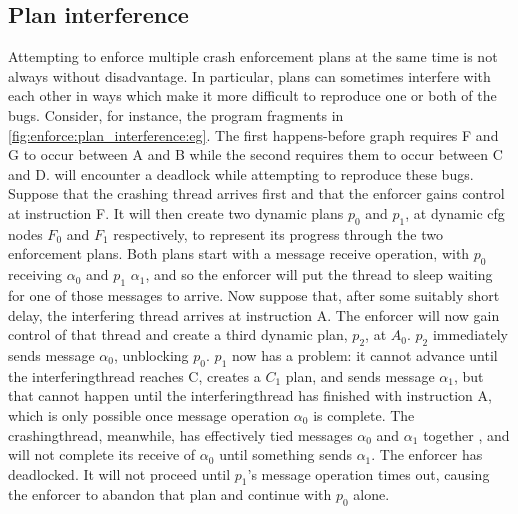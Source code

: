 \subsection{Plan interference}
\label{sect:enforce:plan_interference}

Attempting to enforce multiple crash enforcement plans at the same
time is not always without disadvantage.  In particular, plans can
sometimes interfere with each other in ways which make it more
difficult to reproduce one or both of the bugs.  Consider, for
instance, the program fragments in
\autoref{fig:enforce:plan_interference:eg}.  The first happens-before
graph requires F and G to occur between A and B while the second
requires them to occur between C and D.  {\Implementation} will
encounter a deadlock while attempting to reproduce these bugs.
Suppose that the crashing thread arrives first and that the enforcer
gains control at instruction F.  It will then create two dynamic plans
$p_0$ and $p_1$, at \gls{dynamic cfg} nodes $F_0$ and $F_1$
respectively, to represent its progress through the two enforcement
plans.  Both plans start with a message receive operation, with $p_0$
receiving $\alpha_0$ and $p_1$ $\alpha_1$, and so the enforcer will
put the thread to sleep waiting for one of those messages to arrive.
Now suppose that, after some suitably short delay, the interfering
thread arrives at instruction A.  The enforcer will now gain control
of that thread and create a third dynamic plan, $p_2$, at $A_0$.
$p_2$ immediately sends message $\alpha_0$, unblocking $p_0$.  $p_1$
now has a problem: it cannot advance until the \gls{interferingthread}
reaches C, creates a $C_1$ plan, and sends message $\alpha_1$, but
that cannot happen until the \gls{interferingthread} has finished with
instruction A, which is only possible once message operation
$\alpha_0$ is complete.  The \gls{crashingthread}, meanwhile, has
effectively tied messages $\alpha_0$ and $\alpha_1$ together
, and will not complete its receive of $\alpha_0$ until
something sends $\alpha_1$.  The enforcer has deadlocked.  It will not
proceed until $p_1$'s message operation times out, causing the
enforcer to abandon that plan and continue with $p_0$ alone.


